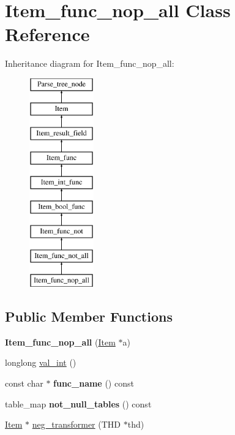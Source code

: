 \hypertarget{classItem__func__nop__all}{}\section{Item\+\_\+func\+\_\+nop\+\_\+all Class Reference}
\label{classItem__func__nop__all}
Inheritance diagram for Item\+\_\+func\+\_\+nop\+\_\+all\+:\begin{figure}[H]
\begin{center}
\leavevmode
\includegraphics[height=9.000000cm]{classItem__func__nop__all}
\end{center}
\end{figure}
\subsection*{Public Member Functions}
\begin{DoxyCompactItemize}
\item 
\mbox{\label{classItem__func__nop__all_a63b15ef7d87c82fcc2fa9a016f9c4201}} 
{\bfseries Item\+\_\+func\+\_\+nop\+\_\+all} (\mbox{\hyperlink{classItem}{Item}} $\ast$a)
\item 
longlong \mbox{\hyperlink{classItem__func__nop__all_a83df49e5ddb63299f2eea0960d6d80f1}{val\+\_\+int}} ()
\item 
\mbox{\label{classItem__func__nop__all_a8d1f71dc92462a3452cf2815b479a461}} 
const char $\ast$ {\bfseries func\+\_\+name} () const
\item 
\mbox{\label{classItem__func__nop__all_add3809cd8d9723c9f5ce77587f7503c5}} 
table\+\_\+map {\bfseries not\+\_\+null\+\_\+tables} () const
\item 
\mbox{\hyperlink{classItem}{Item}} $\ast$ \mbox{\hyperlink{classItem__func__nop__all_a6584dde63d69111ad332417b07883229}{neg\+\_\+transformer}} (T\+HD $\ast$thd)
\end{DoxyCompactItemize}
